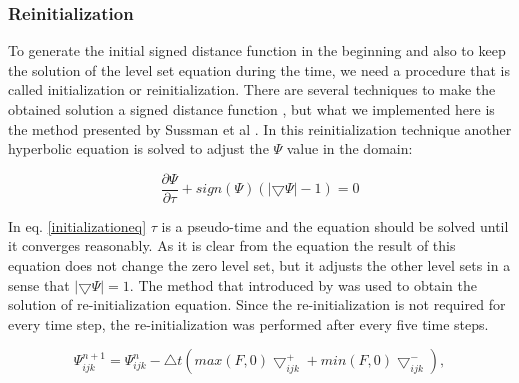\documentclass[letterpaper,10pt]{article}
\begin{document}
% 
% 
         

\subsubsection{Reinitialization} \label{reinitialization}

To generate the initial signed distance function in the beginning and also to keep the solution of the level set equation during 
the time, we need a procedure that is called initialization or reinitialization. There are several techniques to make the obtained 
solution a signed distance function \cite{levelsetbook}, but what we implemented here is the method presented by 
Sussman et al \cite{Sussman}. In this reinitialization technique another hyperbolic equation is solved to adjust the $\varPsi$ value 
in the domain:

\begin{equation}\label{initializationeq}
 \frac{\partial \varPsi}{\partial \tau} + sign(\varPsi) (|\bigtriangledown \varPsi| - 1)= 0 
\end{equation}

In eq. \eqref{initializationeq} $\tau$ is a pseudo-time and the equation should be solved until it converges reasonably. 
As it is clear from the equation the result of this equation does not change the zero level set, but it adjusts the other level sets 
in a sense that $|\bigtriangledown \varPsi|=1$.
The method that introduced by \cite{Adalsteinsson1999} was used to obtain the solution of re-initialization equation. Since the re-initialization 
is not required for every time step, the re-initialization was performed after every five time steps.

\begin{equation}
 \varPsi_{ijk}^{n+1}=\varPsi_{ijk}^{n}-\bigtriangleup t \left(max(F,0)\bigtriangledown_{ijk}^{+}+min(F,0)\bigtriangledown_{ijk}^{-} \right),
\end{equation}
\end{document}
